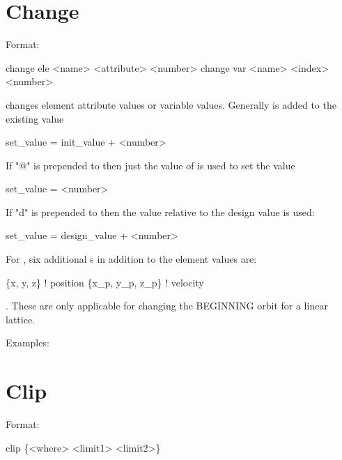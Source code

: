 \section{Change}
\label{s:change}

Format:
\begin{example}
  change ele <name> <attribute> <number>
  change var <name> <index> <number>
\end{example}

\vskip 0.2in
 changes element attribute values or variable values. Generally
 is added to the existing value
\begin{example}
  set_value = init_value + <number>
\end{example}
If "@" is prepended to   then just the value of  is used
to set the value
\begin{example}
  set_value = <number>
\end{example}
If "d" is prepended to   then the value relative to the design
value is used:
\begin{example}
  set_value = design_value + <number>
\end{example}

For , six additional
s in addition to the element values are:
\begin{example}
  \{x, y, z\}           ! position 
  \{x\_p, y\_p, z\_p\}  ! velocity
\end{example}.
These are only applicable for changing the BEGINNING orbit for a linear lattice.

Examples:


\section{Clip}
\label{s:clip}

Format:
\begin{example}
  clip \{<where> <limit1> <limit2>\}
\end{example}

